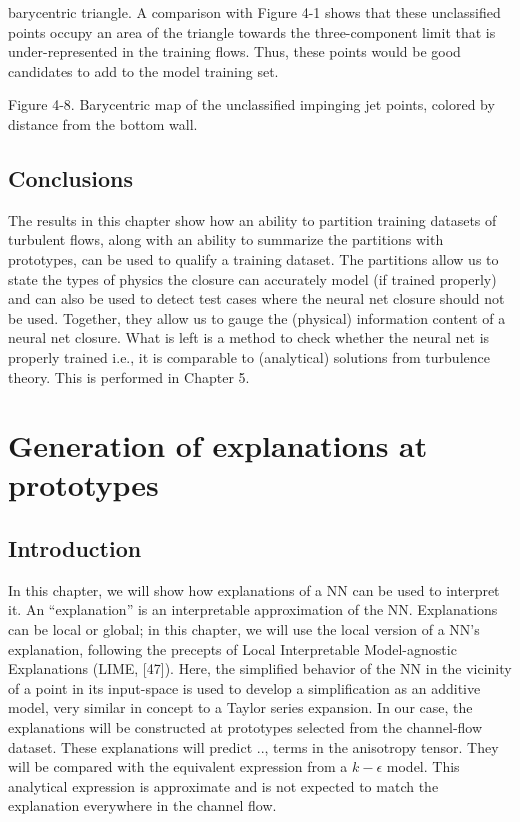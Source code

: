 barycentric triangle. A comparison with Figure 4-1 shows that these unclassiﬁed points occupy an area of
the triangle towards the three-component limit that is under-represented in the training ﬂows. Thus, these points would be good candidates to add to the model training set.

Figure 4-8. Barycentric map of the unclassiﬁed impinging jet points, colored by distance from the bottom wall.

\subsection{Conclusions}

The results in this chapter show how an ability to partition training datasets of turbulent ﬂows, along with an ability to summarize the partitions with prototypes, can be used to qualify a training dataset. The partitions allow us to state the types of physics the closure can accurately model (if trained properly) and can also be used to detect test cases where the neural net closure should not be used. Together, they allow us to gauge the (physical) information content of a neural net closure. What is left is a method to check whether the neural net is properly trained i.e., it is comparable to (analytical) solutions from turbulence theory. This is performed in Chapter 5.

\section{Generation of explanations at prototypes}

\subsection{Introduction}

In this chapter, we will show how explanations of a NN can be used to interpret it. An “explanation” is an interpretable approximation of the NN. Explanations can be local or global; in this chapter, we will use the local version of a NN’s explanation, following the precepts of Local Interpretable Model-agnostic Explanations (LIME, [47]). Here, the simpliﬁed behavior of the NN in the vicinity of a point in its input-space is used to develop a simpliﬁcation as an additive model, very similar in concept to a Taylor series expansion. In our case, the explanations will be constructed at prototypes selected from the channel-ﬂow dataset. These explanations will predict .., terms in the anisotropy tensor. They will be compared with the equivalent expression from a $k-\epsilon$ model. This analytical expression is approximate and is not expected to match the explanation everywhere in the channel ﬂow.

